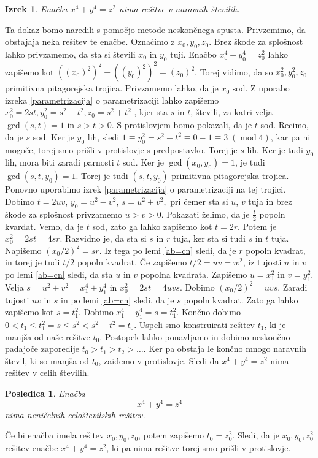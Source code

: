 \documentclass[12pt, a4paper]{article}
\newtheorem{izrek}{Izrek}
\newtheorem{pos}{Posledica}
\renewcommand{\mod}{\operatorname{mod}}
\begin{document}
\begin{izrek}
Enačba $x^4+y^4=z^2$ nima rešitve v naravnih številih.
\end{izrek}
\proof
Ta dokaz bomo naredili s pomočjo metode neskončnega spusta.
Privzemimo, da obstajaja neka rešitev te enačbe. Označimo z $x_0,y_0,z_0$. Brez škode za splošnost lahko privzamemo, da sta si števili $x_0$ in $y_0$ tuji. Enačbo $x_0^4+y_0^4=z_0^2$ lahko zapišemo kot $((x_0)^2)^2+((y_0)^2)^2=(z_0)^2$. Torej vidimo, da so $x_0^2,y_0^2,z_0$ primitivna pitagorejska trojica. Privzamemo lahko, da je $x_0$ sod. Z uporabo izreka \ref{parametrizacija} o parametrizaciji lahko zapišemo $x_0^2 = 2st, y_0^2=s^2-t^2, z_0 = s^2 + t^2$ , kjer sta $s$ in $t$, števili, za katri velja $\gcd(s, t) = 1$ in $s > t > 0$.
S protislovjem bomo pokazali, da je $t$ sod. Recimo, da je $s$ sod. Ker je $y_0$ lih, sledi $1 \equiv y_0^2 = s^2 - t^2 \equiv 0 - 1 \equiv 3 \; (\mod4)$, kar pa ni mogoče, torej smo prišli v protislovje s predpostavko. Torej je $s$ lih. Ker je tudi $y_0$ lih, mora biti zaradi parnosti $t$ sod. Ker je $\gcd (x_0, y_0) =1$, je tudi $\gcd (s,t,y_0)=1$. Torej je tudi $(s, t, y_0)$ primitivna pitagorejska trojica. 
Ponovno uporabimo izrek \ref{parametrizacija} o parametrizaciji na tej trojici. Dobimo $t=2uv$, $y_0=u^2-v^2$, $s=u^2+v^2,$ pri čemer sta si $u$, $v$ tuja in brez škode za splošnost privzamemo $u>v>0$. Pokazati želimo, da je $\frac{t}{2}$ popoln kvardat. Vemo, da je $t$ sod, zato ga lahko zapišemo kot $t=2r$. Potem je $x_0^2=2st=4sr$. Razvidno je, da sta si $s$ in $r$ tuja, ker sta si tudi $s$ in $t$ tuja. Napišemo $(x_0/2)^2=sr$. Iz tega po lemi \ref{ab=cn} sledi, da je $r$ popoln kvadrat, in torej je tudi $t/2$ popoln kvadrat. 
Če zapišemo $t/2=uv=w^2$, iz tujosti $u$ in $v$ po lemi \ref{ab=cn} sledi, da sta $u$ in $v$ popolna kvadrata. Zapišemo $u=x_1^2$ in $v=y_1^2$. Velja $s=u^2+v^2=x_1^4+y_1^4$ in $x_0^2=2st=4uvs$. Dobimo $(x_0/2)^2=uvs$. Zaradi tujosti $uv$ in $s$ in po lemi \ref{ab=cn} sledi, da je $s$ popoln kvadrat. 
Zato ga lahko zapišemo kot $s=t_1^2$. Dobimo $x_1^4+y_1^4=s=t_1^2$. Končno dobimo $0<t_1\leq t_1^2=s\leq s^2<s^2+t^2=t_0$. Uspeli smo konstruirati rešitev $t_1$, ki je manjša od naše rešitve $t_0$. Postopek lahko ponavljamo in dobimo neskončno padajoče zaporedije $t_0>t_1>t_2>\dots$. Ker pa obstaja le končno mnogo naravnih števil, ki so manjša od $t_0$, zaidemo v protislovje. Sledi da $x^4+y^4=z^2$ nima rešitev v celih številih.
\endproof

\begin{pos}
Enačba $$x^4+y^4=z^4$$ nima neničelnih celoštevilskih rešitev.
\end{pos}
\proof
Če bi enačba imela rešitev $x_0,y_0,z_0$, potem zapišemo $t_0=z_0^2$. Sledi, da je  $x_0,y_0,z_0^2$ rešitev enačbe $x^4+y^4=z^2$, ki pa nima rešitve torej smo prišli v protislovje.
\endproof
\end{document}
